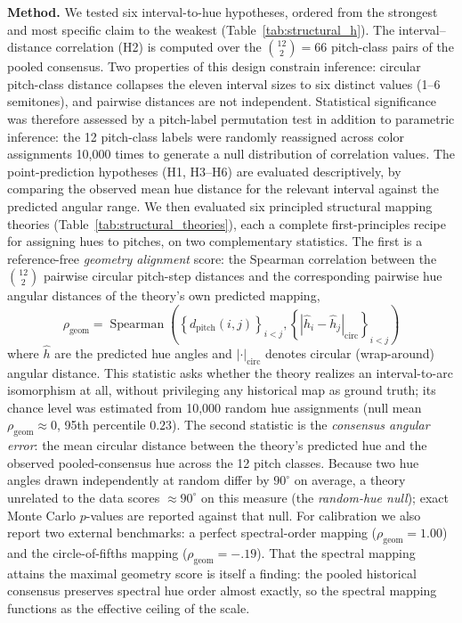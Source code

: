 \documentclass[12pt]{article}
\begin{document}
\textbf{Method.} We tested six interval-to-hue hypotheses, ordered from
the strongest and most specific claim to the weakest
(Table~\ref{tab:structural_h}). The interval--distance correlation (H2)
is computed over the $\binom{12}{2} = 66$ pitch-class pairs of the
pooled consensus. Two properties of this design constrain inference:
circular pitch-class distance collapses the eleven interval sizes to
six distinct values (1--6 semitones), and pairwise distances are not
independent. Statistical significance was therefore assessed by a
pitch-label permutation test in addition to parametric inference: the
12 pitch-class labels were randomly reassigned across color
assignments 10,000 times to generate a null distribution of
correlation values.
The point-prediction hypotheses (H1, H3--H6) are evaluated
descriptively, by comparing the observed mean hue distance for the
relevant interval against the predicted angular range. We then
evaluated six principled
structural mapping theories (Table~\ref{tab:structural_theories}), each
a complete first-principles recipe for assigning hues to pitches, on
two complementary statistics. The first is a reference-free
\emph{geometry alignment} score: the Spearman correlation between the
$\binom{12}{2}$ pairwise circular pitch-step distances and the
corresponding pairwise hue angular distances of the theory's own
predicted mapping,
\begin{equation}
  \rho_{\text{geom}} = \operatorname{Spearman}\!\left(
  \left\{ d_{\text{pitch}}(i,j) \right\}_{i<j},
  \left\{ \left| \hat{h}_i - \hat{h}_j \right|_{\text{circ}}
  \right\}_{i<j} \right)
\label{eq:geometry}
\end{equation}
where $\hat{h}$ are the predicted hue angles and
$|\cdot|_{\text{circ}}$ denotes circular (wrap-around) angular
distance. This statistic asks whether the theory realizes an
interval-to-arc isomorphism at all, without privileging any historical
map as ground truth; its chance level was estimated from 10,000 random
hue assignments (null mean $\rho_{\text{geom}} \approx 0$, 95th
percentile $0.23$). The second statistic is the \emph{consensus
angular error}: the mean circular distance between the theory's
predicted hue and the observed pooled-consensus hue across the 12
pitch classes. Because two hue angles drawn independently at random
differ by $90^\circ$ on average, a theory unrelated to the data scores
$\approx 90^\circ$ on this measure (the \emph{random-hue null}); exact
Monte Carlo $p$-values are reported against that null. For calibration
we also report two external benchmarks: a perfect spectral-order
mapping ($\rho_{\text{geom}} = 1.00$) and the circle-of-fifths mapping
($\rho_{\text{geom}} = -.19$). That the spectral mapping attains the
maximal geometry score is itself a finding: the pooled historical
consensus preserves spectral hue order almost exactly, so the spectral
mapping functions as the effective ceiling of the scale.
\end{document}

